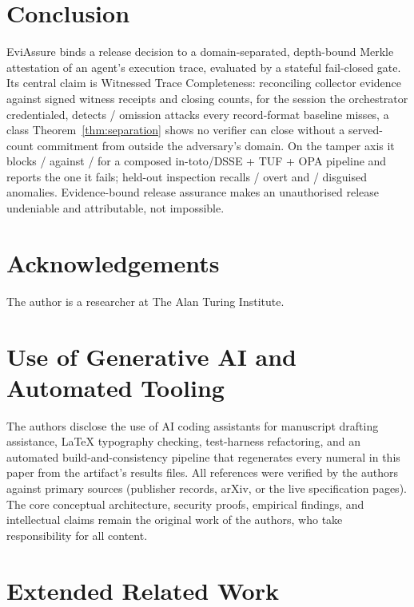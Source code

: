 \documentclass[letterpaper,10pt,twocolumn]{article}
\theoremstyle{definition}
\begin{document}
\section{Conclusion}

EviAssure binds a release decision to a domain-separated, depth-bound Merkle attestation of an agent's execution trace, evaluated by a stateful fail-closed gate. Its central claim is Witnessed Trace Completeness: reconciling collector evidence against signed witness receipts and closing counts, for the session the orchestrator credentialed, detects \omWtc/\omVectors{} omission attacks every record-format baseline misses, a class Theorem~\ref{thm:separation} shows no verifier can close without a served-count commitment from outside the adversary's domain. On the tamper axis it blocks \eviBlocked/\eviTotal{} against \compBlocked/\compTotal{} for a composed in-toto/DSSE + TUF + OPA pipeline and reports the one it fails; held-out inspection recalls \insOvertK/\insOvertN{} overt and \insStealthK/\insStealthN{} disguised anomalies. Evidence-bound release assurance makes an unauthorised release undeniable and attributable, not impossible.

\ifanonymous\else
\section*{Acknowledgements}
The author is a researcher at The Alan Turing Institute.
\fi




\appendix
\section*{Use of Generative AI and Automated Tooling}
The authors disclose the use of AI coding assistants for manuscript drafting assistance, LaTeX typography checking, test-harness refactoring, and an automated build-and-consistency pipeline that regenerates every numeral in this paper from the artifact's results files. All references were verified by the authors against primary sources (publisher records, arXiv, or the live specification pages). The core conceptual architecture, security proofs, empirical findings, and intellectual claims remain the original work of the authors, who take responsibility for all content.

\section{Extended Related Work}\label{sec:appendix_relwork}
\end{document}
